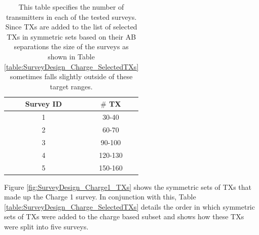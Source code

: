 \documentclass[preprint,authoryear,12pt]{elsarticle}
\begin{document}
\begin{table} [htp]
   \footnotesize
   \begin{center}
      \begin{tabular}{| c | c |}
         \hline
         \textbf{Survey ID} & \textbf{\mbox{\boldmath$\#$} TX} \\
         \hline
         1 & 30-40 \\
         \hline
         2 & 60-70 \\
         \hline
         3 & 90-100 \\
         \hline
         4 & 120-130 \\
         \hline
         5 & 150-160 \\
         \hline
      \end{tabular}
   \end{center}
\caption{This table specifies the number of transmitters in each of the tested surveys. Since TXs are added to the list of selected TXs in symmetric sets based on their AB separations the size of the surveys as shown in Table \ref{table:SurveyDesign_Charge_SelectedTXs} sometimes falls slightly outside of these target ranges.}
\label{table:SurveyDesign_SurveyID_vs_NumTX}
\end{table}


Figure \ref{fig:SurveyDesign_Charge1_TXs} shows the symmetric sets of TXs that made up the Charge 1 survey. In conjunction with this, Table \ref{table:SurveyDesign_Charge_SelectedTXs} details the order in which symmetric sets of TXs were added to the charge based subset and shows how these TXs were split into five surveys.
\end{document}
